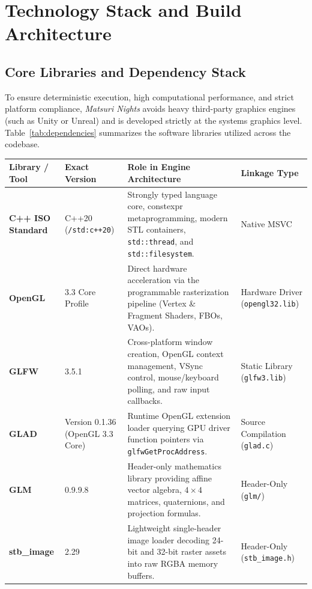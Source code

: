 \chapter{Technology Stack and Build Architecture}
\label{chap:tech_stack}

\section{Core Libraries and Dependency Stack}
To ensure deterministic execution, high computational performance, and strict platform compliance, \textit{Matsuri Nights} avoids heavy third-party graphics engines (such as Unity or Unreal) and is developed strictly at the systems graphics level. Table~\ref{tab:dependencies} summarizes the software libraries utilized across the codebase.

\begin{table}[htbp]
\centering
\footnotesize
\renewcommand{\arraystretch}{0.92}
\begin{tabularx}{\textwidth}{p{3.2cm} p{2.2cm} p{5.5cm} p{3.5cm}}
\toprule
\textbf{Library / Tool} & \textbf{Exact Version} & \textbf{Role in Engine Architecture} & \textbf{Linkage Type} \\
\midrule
\textbf{C++ ISO Standard} & C++20 \newline (\texttt{/std:c++20}) & Strongly typed language core, constexpr metaprogramming, modern STL containers, \texttt{std::thread}, and \texttt{std::filesystem}. & Native MSVC \\
\addlinespace
\textbf{OpenGL} & 3.3 Core Profile & Direct hardware acceleration via the programmable rasterization pipeline (Vertex \& Fragment Shaders, FBOs, VAOs). & Hardware Driver (\texttt{opengl32.lib}) \\
\addlinespace
\textbf{GLFW} & 3.5.1 & Cross-platform window creation, OpenGL context management, VSync control, mouse/keyboard polling, and raw input callbacks. & Static Library (\texttt{glfw3.lib}) \\
\addlinespace
\textbf{GLAD} & Version 0.1.36 (OpenGL 3.3 Core) & Runtime OpenGL extension loader querying GPU driver function pointers via \texttt{glfwGetProcAddress}. & Source Compilation (\texttt{glad.c}) \\
\addlinespace
\textbf{GLM} & 0.9.9.8 & Header-only mathematics library providing affine vector algebra, $4\times 4$ matrices, quaternions, and projection formulas. & Header-Only (\texttt{glm/}) \\
\addlinespace
\textbf{stb\_image} & 2.29 & Lightweight single-header image loader decoding 24-bit and 32-bit raster assets into raw RGBA memory buffers. & Header-Only (\texttt{stb\_image.h}) \\

\end{tabularx}
\end{table}

